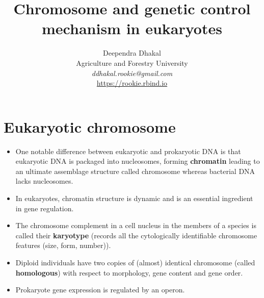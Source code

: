 \documentclass[11pt,dvipsnames,ignorenonframetext,aspectratio=169]{beamer}
\title[]{Chromosome and genetic control mechanism in eukaryotes}
\author[
        Deependra Dhakal\\
Agriculture and Forestry University\\
\textit{ddhakal.rookie@gmail.com}\\
\url{https://rookie.rbind.io}
    ]{Deependra Dhakal\\
Agriculture and Forestry University\\
\textit{ddhakal.rookie@gmail.com}\\
\url{https://rookie.rbind.io}}
\date[
      
  ]{
    }
\providecommand{\tightlist}{%
  \setlength{\itemsep}{0pt}\setlength{\parskip}{0pt}}
\begin{document}
  \begin{frame}[plain]
  \titlepage
  \end{frame}



\hypertarget{eukaryotic-chromosome}{%
\section{Eukaryotic chromosome}\label{eukaryotic-chromosome}}

\begin{frame}{}
\protect\hypertarget{section}{}
\end{frame}

\begin{frame}{}
\protect\hypertarget{section-1}{}
\begin{itemize}
\tightlist
\item
  One notable difference between eukaryotic and prokaryotic DNA is that
  eukaryotic DNA is packaged into nucleosomes, forming
  \textbf{chromatin} leading to an ultimate assemblage structure called
  chromosome whereas bacterial DNA lacks nucleosomes.
\item
  In eukaryotes, chromatin structure is dynamic and is an essential
  ingredient in gene regulation.
\item
  The chromosome complement in a cell nucleus in the members of a
  species is called their \textbf{karyotype} (records all the
  cytologically identifiable chromosome features (size, form, number)).
\item
  Diploid individuals have two copies of (almost) identical chromosome
  (called \textbf{homologous}) with respect to morphology, gene content
  and gene order.
\item
  Prokaryote gene expression is regulated by an operon.
\end{itemize}
\end{frame}
\end{document}
